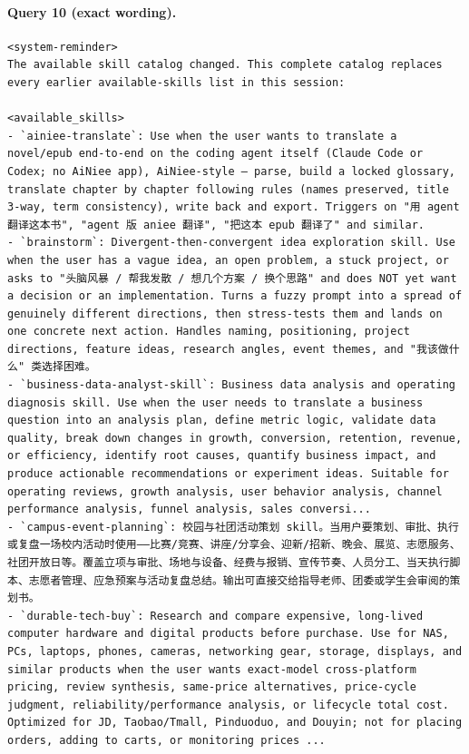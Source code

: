 \documentclass[UTF8,10pt]{ctexart}
\begin{document}
\paragraph{Query 10 (exact wording).}
\begin{Verbatim}[breaklines=true,breakanywhere=true,fontsize=\scriptsize,frame=single,framesep=2pt]
<system-reminder>
The available skill catalog changed. This complete catalog replaces every earlier available-skills list in this session:

<available_skills>
- `ainiee-translate`: Use when the user wants to translate a novel/epub end-to-end on the coding agent itself (Claude Code or Codex; no AiNiee app), AiNiee-style — parse, build a locked glossary, translate chapter by chapter following rules (names preserved, title 3-way, term consistency), write back and export. Triggers on "用 agent 翻译这本书", "agent 版 aniee 翻译", "把这本 epub 翻译了" and similar.
- `brainstorm`: Divergent-then-convergent idea exploration skill. Use when the user has a vague idea, an open problem, a stuck project, or asks to "头脑风暴 / 帮我发散 / 想几个方案 / 换个思路" and does NOT yet want a decision or an implementation. Turns a fuzzy prompt into a spread of genuinely different directions, then stress-tests them and lands on one concrete next action. Handles naming, positioning, project directions, feature ideas, research angles, event themes, and "我该做什么" 类选择困难。
- `business-data-analyst-skill`: Business data analysis and operating diagnosis skill. Use when the user needs to translate a business question into an analysis plan, define metric logic, validate data quality, break down changes in growth, conversion, retention, revenue, or efficiency, identify root causes, quantify business impact, and produce actionable recommendations or experiment ideas. Suitable for operating reviews, growth analysis, user behavior analysis, channel performance analysis, funnel analysis, sales conversi...
- `campus-event-planning`: 校园与社团活动策划 skill。当用户要策划、审批、执行或复盘一场校内活动时使用——比赛/竞赛、讲座/分享会、迎新/招新、晚会、展览、志愿服务、社团开放日等。覆盖立项与审批、场地与设备、经费与报销、宣传节奏、人员分工、当天执行脚本、志愿者管理、应急预案与活动复盘总结。输出可直接交给指导老师、团委或学生会审阅的策划书。
- `durable-tech-buy`: Research and compare expensive, long-lived computer hardware and digital products before purchase. Use for NAS, PCs, laptops, phones, cameras, networking gear, storage, displays, and similar products when the user wants exact-model cross-platform pricing, review synthesis, same-price alternatives, price-cycle judgment, reliability/performance analysis, or lifecycle total cost. Optimized for JD, Taobao/Tmall, Pinduoduo, and Douyin; not for placing orders, adding to carts, or monitoring prices ...

\end{Verbatim}
\end{document}
